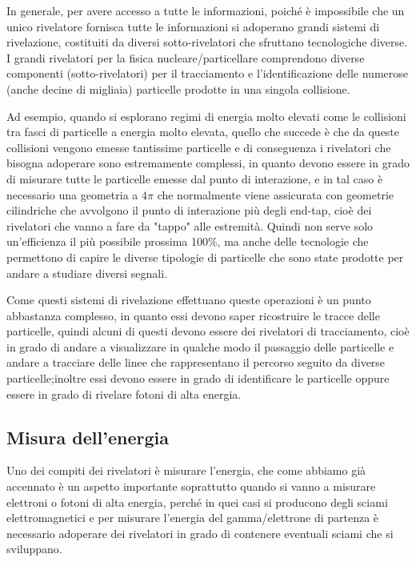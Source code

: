 In generale, per avere accesso a tutte le informazioni, poiché è impossibile che un unico rivelatore fornisca tutte le informazioni si adoperano grandi sistemi di rivelazione, costituiti da diversi sotto-rivelatori che sfruttano tecnologiche diverse. I grandi rivelatori per la fisica nucleare/particellare comprendono diverse componenti (sotto-rivelatori) per il tracciamento e l'identificazione delle numerose (anche decine di migliaia) particelle prodotte in una singola collisione.

Ad esempio, quando si esplorano regimi di energia molto elevati come le collisioni tra fasci di particelle a energia molto elevata, quello che succede è che da queste collisioni vengono emesse tantissime particelle e di conseguenza i rivelatori che bisogna adoperare sono estremamente complessi, in quanto devono essere in grado di misurare tutte le particelle emesse dal punto di interazione, e in tal caso è necessario una geometria a $4\pi$ che normalmente viene assicurata con geometrie cilindriche che avvolgono il punto di interazione più degli end-tap, cioè dei rivelatori che vanno a fare da "tappo" alle estremità. Quindi non serve solo un'efficienza il più possibile prossima 100\%, ma anche delle tecnologie che permettono di capire le diverse tipologie di particelle che sono state prodotte per andare a studiare diversi segnali. 

Come questi sistemi di rivelazione effettuano queste operazioni è un punto abbastanza complesso, in quanto essi devono saper ricostruire le tracce delle particelle, quindi alcuni di questi devono essere dei rivelatori di tracciamento, cioè in grado di andare a visualizzare in qualche modo il passaggio delle particelle e andare a tracciare delle linee che rappresentano il percorso seguito da diverse particelle;inoltre essi devono essere in grado di identificare le particelle oppure essere in grado di rivelare fotoni di alta energia.

\subsection{Misura dell'energia}

Uno dei compiti dei rivelatori è misurare l'energia, che come abbiamo già accennato è un aspetto importante soprattutto quando si vanno a misurare elettroni o fotoni di alta energia, perché in quei casi si producono degli sciami elettromagnetici e per misurare l'energia del gamma/elettrone di partenza è necessario adoperare dei rivelatori in grado di contenere eventuali sciami che si sviluppano.

